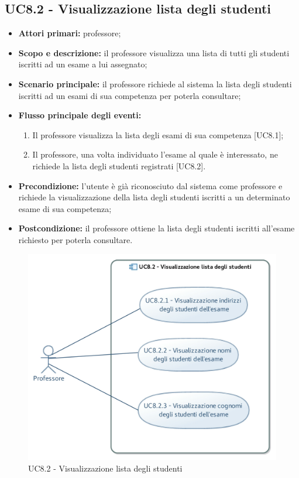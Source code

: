 \documentclass[AnalisiDeiRequisiti.tex]{subfiles}
\begin{document}
\subsection{UC8.2 - Visualizzazione lista degli studenti}
\begin{itemize}
	\item \textbf{Attori primari:} professore;
	\item \textbf{Scopo e descrizione:} il professore visualizza una lista di tutti gli studenti iscritti ad un esame a lui assegnato;
	\item \textbf{Scenario principale:} il professore richiede al sistema la lista degli studenti iscritti ad un esami di sua competenza per poterla consultare;
	\item \textbf{Flusso principale degli eventi:}
	\begin{enumerate}
		\item Il professore visualizza la lista degli esami di sua competenza [UC8.1];
		\item Il professore, una volta individuato l'esame al quale è interessato, ne richiede la lista degli studenti registrati [UC8.2].
	\end{enumerate}
	\item \textbf{Precondizione:} l'utente è già riconosciuto dal sistema come professore e richiede la visualizzazione della lista degli studenti iscritti a un determinato esame di sua competenza;
	\item \textbf{Postcondizione:} il professore ottiene la lista degli studenti iscritti all'esame richiesto per poterla consultare.
\end{itemize}
\begin{figure}[H]
	\centering
	\includegraphics[width=0.7\linewidth]{UC8_2.jpg}
	\caption{UC8.2 - Visualizzazione lista degli studenti}
	\label{UC8.2 - Visualizzazione lista degli studenti}
\end{figure}
\end{document}
